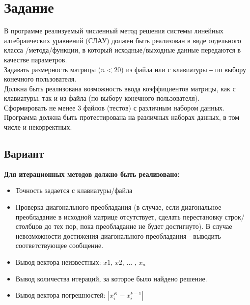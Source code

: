 \documentclass{article}
\begin{document}
\itmo[
      variant=13,
      labn=1,
      discipline=Вычислительная математика,
      group=P3212,
      student=Соколов Анатолий Владимирович,
      teacher=Наумова Надежда Александровна 
]
\lstset{language=rust}
\tableofcontents

\section{Задание}
      В программе реализуемый численный метод решения системы линейных алгебраических уравнений (СЛАУ) должен быть реализован в виде отдельного класса /метода/функции, в который исходные/выходные данные передаются в качестве параметров.
      \\
      Задавать размерность матрицы ($n<20$) из файла или с клавиатуры ‒ по выбору конечного пользователя.
      \\      
      Должна быть реализована возможность ввода коэффициентов матрицы, как с клавиатуры, так и из файла (по выбору конечного пользователя).
      \\
      Сформировать не менее 3 файлов (тестов) с различным набором данных.
      \\
      Программа должна быть протестирована на различных наборах данных, в том числе и некорректных.

\subsection{Вариант}

\textbf{Для итерационных методов должно быть реализовано:}

\begin{center}
      \begin{itemize}
      \item Точность задается с клавиатуры/файла
      \item Проверка диагонального преобладания (в случае, если диагональное преобладание в исходной матрице отсутствует, сделать перестановку строк/столбцов до тех пор, пока преобладание не будет достигнуто). В случае невозможности достижения диагонального преобладания - выводить соответствующее сообщение.
      \item Вывод вектора неизвестных: $x1$, $x2$, $\dots$ , $x_n$
      \item Вывод количества итераций, за которое было найдено решение.
      \item Вывод вектора погрешностей: $|x_i^K-x_i^{k-1}|$
      \end{itemize}
\end{center}
\end{document}

